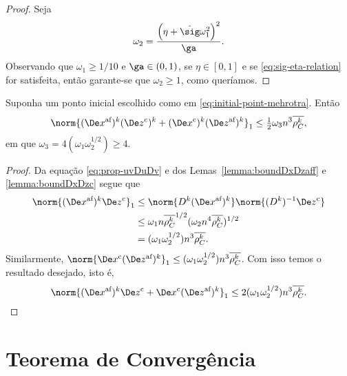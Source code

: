 \begin{proof}
Seja
\begin{equation}
\label{eq:omega2}
	\omega_2 = \frac{\left(\eta +{\nextsig} \omega_1^{2} \right)^{2}}{\ga}.
	\end{equation}
Observando que  $\omega_1 \geq 1/10$ e  $\ga\in(0,1)$,  se $\eta\in[0,1]$ e se \eqref{eq:sig-eta-relation} for satisfeita, então garante-se que $\omega_2\geq 1$, como queríamos. \qedhere





\end{proof}

\begin{lema}\label{lemma:boundDxDzaff-c}
	Suponha um ponto inicial escolhido como em \eqref{eq:initial-point-mehrotra}. Então 
	\begin{equation}\label{eq:lemma-boundDxDzaff-c}
		\norm{ \dekx(\Decoz)^{k} + (\Decox)^{k}  \dekz  }_{1} \leq  \tfrac{1}{2}\omega_{3}n^{3}\dbvec{\rho_C^{k}},
	\end{equation}
em que $\omega_{3} = 4(\omega_1\omega_2^{1/2})\geq 4 $.
\end{lema}

\begin{proof}
	Da equação \eqref{eq:prop-uvDuDv} e dos Lemas~\ref{lemma:boundDxDzaff} e \ref{lemma:boundDxDzc} segue que  
	\begin{align*}	
		\norm{ \dekx \Decoz}_{1} & \leq \norm{\Dk \dekx }\norm{\Dik\Decoz}\\
							  & \leq 	\omega_1 n\dbvec{\rho_C^k }^{1/2}(\omega_2 n^{4}\dbvec{\rho_C^k })^{1/2}  \\
							  & = (\omega_1\omega_2^{1/2})n^{3}\dbvec{\rho_C^k }.
	\end{align*}			  
Similarmente, 	$\norm{\Decox \dekz }_{1} \leq (\omega_1\omega_2^{1/2})n^{3}\dbvec{\rho_C^k }$. Com isso temos o resultado desejado, isto é,
\[
		\norm{ \dekx \Decoz + \Decox \dekz }_{1} \leq 2(\omega_1\omega_2^{1/2})n^{3}\dbvec{\rho_C^k }.\qedhere
\]
\end{proof}

\section{Teorema de Convergência}

